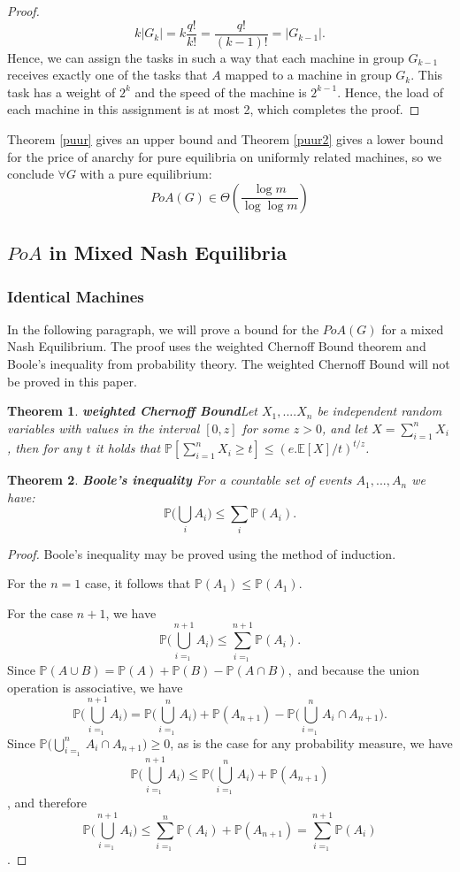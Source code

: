 \documentclass[a4paper,11pt]{article}
\newtheorem{theorem}{Theorem}[section]
\renewcommand{\P}{{\mathbb P}}
\newcommand{\E}{{\mathbb E}}
\begin{document}
\begin{proof}
$$k|G_k| = k\frac{q!}{k!} = \frac{q!}{(k-1)!}= |G_{k-1}|.$$
Hence, we can assign the tasks in such a way that each machine in group $G_{k-1}$ receives exactly one of the tasks that $A$ mapped to a machine in group $G_k$. This task has a weight of $2^k$ and the speed of the machine is $2^{k-1}$. Hence, the load of each machine in this assignment is at most 2, which completes the proof.
\end{proof}
Theorem \ref{puur} gives an upper bound and Theorem \ref{puur2} gives a lower bound  for the price of anarchy for pure equilibria on uniformly related machines, so we conclude $\forall G$ with a pure equilibrium:
$$PoA(G) \in \Theta\left(\frac{\log m}{\log \log m}\right)$$



\subsection{$PoA$ in Mixed Nash Equilibria}
\subsubsection {Identical Machines}
In the following paragraph, we will prove a bound for the $PoA(G)$ for a mixed Nash Equilibrium. The proof uses the weighted Chernoff Bound theorem and Boole's inequality from probability theory. The weighted Chernoff Bound will not be proved in this paper.
\begin{theorem}\textbf{weighted Chernoff Bound}\label{chernoff}
Let $X_1,....X_n$ be independent random variables with values in the interval $[0,z]$ for some $z > 0$, and let $X = \sum^n_{i=1}X_i$, then for any $t$ it holds that $\P[\sum^n_{i=1}X_i\geq t] \leq (e.\E[X]/t)^{t/z}$.
\end{theorem}

\begin{theorem}\textbf{Boole's inequality}\cite{13}
For a countable set of events $A_1,...,A_n$ we have:
$$ \P\biggl(\bigcup_{i} A_i\biggr) \le \sum_i \P(A_i).$$
\end{theorem}
\begin{proof}
Boole's inequality may be proved using the method of induction.

For the $n=1$ case, it follows that
$\mathbb P(A_1) \le \mathbb P(A_1).$

For the case $n + 1$, we have
$$\P\biggl(\bigcup_{i=_1}^{n+1} A_i\biggr) \le \sum_{i=_1}^{n+1} \P(A_i).$$
Since $\mathbb P(A \cup B) = \mathbb P(A) + \mathbb P(B) - \mathbb P(A \cap B),$ and because the union operation is associative, we have
$$\P\biggl(\bigcup_{i=_1}^{n+1} A_i\biggr) = \P\biggl(\bigcup_{i=_1}^n A_i\biggr) + \mathbb P(A_{n+1}) - \P\biggl(\bigcup_{i=_1}^n A_i \cap A_{n+1}\biggr).$$
Since $\P\biggl(\bigcup_{i=_1}^n A_i \cap A_{n+1}\biggr) \ge 0$, as is the case for any probability measure, we have
$$\P\biggl(\bigcup_{i=_1}^{n+1} A_i\biggr) \le \P\biggl(\bigcup_{i=_1}^n A_i\biggr) + \mathbb P(A_{n+1})$$,
and therefore
$$\P\biggl(\bigcup_{i=_1}^{n+1} A_i\biggr) \le \sum_{i=_1}^{n} \P(A_i) + \mathbb P(A_{n+1}) = \sum_{i=_1}^{n+1} \P(A_i)$$.
\end{proof}
\end{document}
